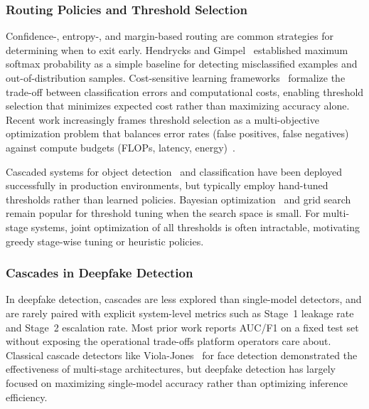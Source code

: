 \subsubsection*{Routing Policies and Threshold Selection}
Confidence\hyp, entropy\hyp, and margin\hyp based routing are common strategies for determining when to exit early. Hendrycks and Gimpel~\cite{hendrycks2017baseline} established maximum softmax probability as a simple baseline for detecting misclassified examples and out\hyp of\hyp distribution samples. Cost\hyp sensitive learning frameworks~\cite{elkan2001cost} formalize the trade\hyp off between classification errors and computational costs, enabling threshold selection that minimizes expected cost rather than maximizing accuracy alone. Recent work increasingly frames threshold selection as a multi\hyp objective optimization problem that balances error rates (false positives, false negatives) against compute budgets (FLOPs, latency, energy)~\cite{laskaridis2020hapi,laskaridis2020spinn}.

Cascaded systems for object detection~\cite{viola2001rapid} and classification have been deployed successfully in production environments, but typically employ hand\hyp tuned thresholds rather than learned policies. Bayesian optimization~\cite{snoek2012bayesopt} and grid search remain popular for threshold tuning when the search space is small. For multi\hyp stage systems, joint optimization of all thresholds is often intractable, motivating greedy stage\hyp wise tuning or heuristic policies.

\subsubsection*{Cascades in Deepfake Detection}
In deepfake detection, cascades are less explored than single\hyp model detectors, and are rarely paired with explicit system\hyp level metrics such as Stage~1 leakage rate and Stage~2 escalation rate. Most prior work reports AUC/F1 on a fixed test set without exposing the operational trade\hyp offs platform operators care about. Classical cascade detectors like Viola\hyp Jones~\cite{viola2001rapid} for face detection demonstrated the effectiveness of multi\hyp stage architectures, but deepfake detection has largely focused on maximizing single\hyp model accuracy rather than optimizing inference efficiency.

